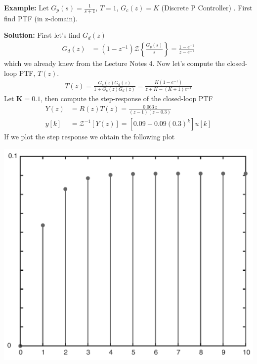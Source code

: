\documentclass[twoside]{article}
\begin{document}
\textbf{Example:} Let $G_p(s) = \frac{1}{s+1}$, $T=1$, $G_c(z) =
K$ (Discrete P Controller) . First find PTF (in z-domain).

\textbf{Solution:} First let's find $G_d(z)$ 
%
\begin{align*}
  G_d(z) &= (1 - z^{-1}) \mathcal{Z} \left\lbrace \frac{G_p(s)}{s}  \right\rbrace =
         \frac{1-e^{-1}}{z - e^{-1}} 
\end{align*}
%
which we already knew from the Lecture Notes 4. Now let's compute the
closed-loop PTF, $T(z)$.
%
\begin{align*}
T(z) =  \frac{G_c(z) G_d(z)}{1 + G_c(z) G_d(z)} = \frac{K(1 -e^{-1})}{z + K - (K+1) e^{-1}} 
\end{align*}
%
Let $\mathbf{K = 0.1}$, then compute the step-response of the closed-loop PTF
%
\begin{align*}
Y(z) &= R(z) T(z) = \frac{0.063 \, z}{(z-1)(z-0.3)}
\\
y[k] &= \mathcal{Z}^{-1} [ Y(z) ] = \left[  0.09 - 0.09 (0.3)^k
  \right] u[k]
\end{align*}
%
If we plot the step response we obtain the following plot
%
    \begin{center}
\begin{minipage}[h]{0.5\linewidth}
    \begin{center}
      \includegraphics[width=\textwidth]{normal}
    \end{center}
\end{minipage}
    \end{center}
%
\end{document}
